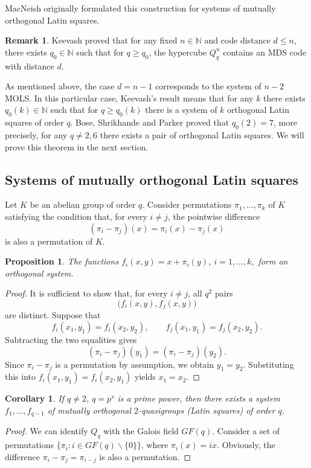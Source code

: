 \documentclass[11pt]{article}
\newtheorem{claim}{Proposition}[section]
\newtheorem{corollary}{Corollary}[section]
\theoremstyle{definition}
\newtheorem{remark}{Remark}[section]
\begin{document}
{{{MacNeish originally formulated this construction for systems of mutually orthogonal Latin squares.

\begin{remark}
Keevash \cite{Keevash18} proved that for any fixed $n\in
\mathbb{N}$ and code distance $d\leq n$, there exists $q_0\in
\mathbb{N}$ such that for $q\geq q_0$, the hypercube $Q^n_q$ contains an {\rm
MDS} code with distance $d$.
\end{remark}

As mentioned above, the case  $d=n-1$ corresponds to the system of $n-2$ MOLS.
In this particular case, Keevash's result means that for any $k$
there exists $q_0(k)\in \mathbb{N}$ such that for $q\geq q_0(k)$
there is a system of $k$ orthogonal Latin squares of order
$q$.  Bose,   Shrikhande and Parker \cite{BShP} proved that $q_0(2)=7$, more precisely,
for any $q\neq 2,6$ there exists a pair of orthogonal Latin
squares. We will prove this theorem in the next section.

\subsection{Systems of mutually orthogonal Latin squares}

Let $K$ be an abelian group of order $q$. Consider permutations
$\pi_1,\dots,\pi_k$ of $K$ satisfying the condition that, for every
$i\neq j$, the pointwise difference
\[
(\pi_i-\pi_j)(x)=\pi_i(x)-\pi_j(x)
\]
is also a permutation of $K$.

\begin{claim}
The functions
$f_i(x,y)=x+\pi_i(y)$, $i=1,\dots,k,$
form an orthogonal system.
\end{claim}

\begin{proof}
It is sufficient to show that, for every $i\neq j$, all $q^2$ pairs
\[
\bigl(f_i(x,y),f_j(x,y)\bigr)
\]
are distinct. Suppose that
\[
f_i(x_1,y_1)=f_i(x_2,y_2), \qquad
f_j(x_1,y_1)=f_j(x_2,y_2).
\]
Subtracting the two equalities gives
\[
(\pi_i-\pi_j)(y_1)=(\pi_i-\pi_j)(y_2).
\]
Since $\pi_i-\pi_j$ is a permutation by assumption, we obtain
$y_1=y_2$. Substituting this into
$f_i(x_1,y_1)=f_i(x_2,y_1)$ yields $x_1=x_2$.
\end{proof}


\begin{corollary}\label{MOLS} If $q\neq 2$, $q=p^s$ is a prime
power, then there exists a system $f_1,\dots,f_{q-1}$ of mutually orthogonal
$2$-quasigroups (Latin squares) of order $q$.
\end{corollary}
\begin{proof}
We can identify  $Q_q$ with the Galois field  $GF(q)$.
Consider a set of permutations $\{\pi_i : i\in  GF(q)\backslash \{0\} \}$, where $\pi_i(x)=ix$.  Obviously, the difference $\pi_i-\pi_j=\pi_{i-j}$ is also a permutation. 
\end{proof}







}}}
\end{document}
